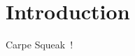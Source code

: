 
\chapter{Introduction}
\label{cha:introduction}

Carpe Squeak~\cite{thiede2022augmenting,thiede2023squeak,thiede2023symbolic,thiede2023object,thiede2023time,thiede2024bringing,thiede2024talking}!
